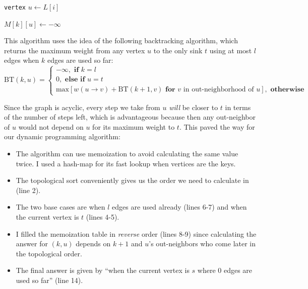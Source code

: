 \documentclass{article}
\begin{document}
\begin{enumerate}
\begin{center}
\begin{minipage}{\linewidth}
\begin{algorithm}[H]
          {
          {
            \texttt{vertex} $u \gets L[i]$

            $M[k][u] \gets -\infty$

            }
          }


        \end{algorithm}
      \end{minipage}
    \end{center}

    This algorithm uses the idea of the following backtracking algorithm, which returns the maximum weight from any vertex $u$ to the only sink $t$ using at most $l$ edges when $k$ edges are used so far:
    $$
      \text{BT}(k, u) = \begin{cases}
        -\infty,\textbf{ if }k = l \\
        0,\textbf{ else if }u = t  \\
        \text{max}[w(u \rightarrow v) + \text{BT}(k+1, v)\textbf{ for }v\text{ in out-neighborhood of }u],\textbf{ otherwise}
      \end{cases}
    $$

    Since the graph is acyclic, every step we take from $u$ \textit{will} be closer to $t$ in terms of the number of steps left, which is advantageous because then any out-neighbor of $u$ would not depend on $u$ for its maximum weight to $t$. This paved the way for our dynamic programming algorithm:
    \begin{itemize}
      \item The algorithm can use memoization to avoid calculating the same value twice. I used a hash-map for its fast lookup when vertices are the keys.
      \item The topological sort conveniently gives us the order we need to calculate in (line 2).
      \item The two base cases are when $l$ edges are used already (lines 6-7) and when the current vertex is $t$ (lines 4-5).
      \item I filled the memoization table in \textit{reverse} order (lines 8-9) since calculating the answer for $(k, u)$ depends on $k+1$ and $u$'s out-neighbors who come later in the topological order.
      \item The final answer is given by ``when the current vertex is $s$ where 0 edges are used so far'' (line 14).
    \end{itemize}


\end{enumerate}
\end{document}
